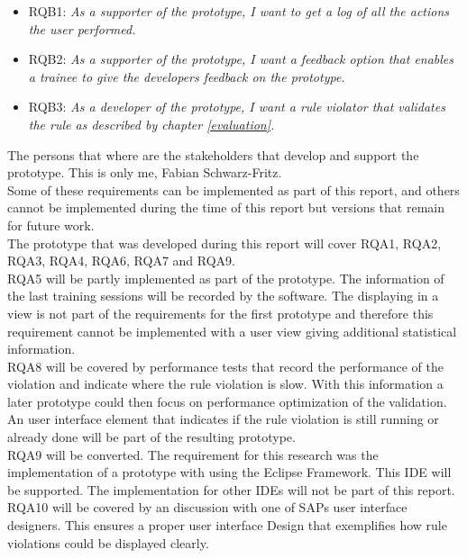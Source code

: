 \begin{itemize}
  \item RQB1: \textit{As a supporter of the prototype, I want to get a log of all the actions the user performed.}
  \item RQB2: \textit{As a supporter of the prototype, I want a feedback option that enables a trainee to give the developers feedback on the prototype.}
  \item RQB3: \textit{As a developer of the prototype, I want a rule violator that validates the rule as described by chapter \ref{evaluation}.}
\end{itemize}

The persons that where are the stakeholders that develop and support the prototype. This is only me, Fabian Schwarz-Fritz. 
\\

Some of these requirements can be implemented as part of this report, and others cannot be implemented during the time of this report but versions that remain for future work. 
\\

The prototype that was developed during this report will cover RQA1, RQA2, RQA3, RQA4, RQA6, RQA7 and RQA9. 
\\

RQA5 will be partly implemented as part of the prototype. The information of the last training sessions will be recorded by the software. The displaying in a view is not part of the requirements for the first prototype and therefore this requirement cannot be implemented with a user view giving additional statistical information. 
\\

RQA8 will be covered by performance tests that record the performance of the violation and indicate where the rule violation is slow. With this information a later prototype could then focus on performance optimization of the validation. An user interface element that indicates if the rule violation is still running or already done will be part of the resulting prototype.
\\

RQA9 will be converted. The requirement for this research was the implementation of a prototype with using the Eclipse Framework. This \acf{IDE} will be supported. The implementation for other \acf{IDE}s will not be part of this report.
\\

RQA10 will be covered by an discussion with one of SAPs user interface designers. This ensures a proper user interface Design that exemplifies how rule violations could be displayed clearly.
\\

